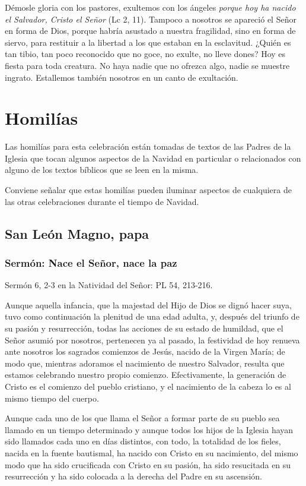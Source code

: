 \begin{body}
\begin{body}
Démosle gloria con los pastores, exultemos con los ángeles \emph{porque hoy ha nacido el Salvador, Cristo el Señor} (Lc 2, 11). Tampoco a nosotros se apareció el Señor en forma de Dios, porque habría asustado a nuestra fragilidad, sino en forma de siervo, para restituir a la libertad a los que estaban en la esclavitud. ¿Quién es tan tibio, tan poco reconocido que no goce, no exulte, no lleve dones? Hoy es fiesta para toda creatura. No haya nadie que no ofrezca algo, nadie se muestre ingrato. Estallemos también nosotros en un canto de exultación.

\section{Homilías}

Las homilías para esta celebración están tomadas de textos de las Padres de la Iglesia que tocan algunos aspectos de la Navidad en particular o relacionados con alguno de los textos bíblicos que se leen en la misma.

Conviene señalar que estas homilías pueden iluminar aspectos de cualquiera de las otras celebraciones durante el tiempo de Navidad.

\subsection{San León Magno, papa}

\subsubsection{Sermón: Nace el Señor, nace la paz}

Sermón 6, 2-3 en la Natividad del Señor: PL 54, 213-216.

Aunque aquella infancia, que la majestad del Hijo de Dios se dignó hacer suya, tuvo como continuación la plenitud de una edad adulta, y, después del triunfo de su pasión y resurrección, todas las acciones de su estado de humildad, que el Señor asumió por nosotros, pertenecen ya al pasado, la festividad de hoy renueva ante nosotros los sagrados comienzos de Jesús, nacido de la Virgen María; de modo que, mientras adoramos el nacimiento de nuestro Salvador, resulta que estamos celebrando nuestro propio comienzo. Efectivamente, la generación de Cristo es el comienzo del pueblo cristiano, y el nacimiento de la cabeza lo es al mismo tiempo del cuerpo.

Aunque cada uno de los que llama el Señor a formar parte de su pueblo sea llamado en un tiempo determinado y aunque todos los hijos de la Iglesia hayan sido llamados cada uno en días distintos, con todo, la totalidad de los fieles, nacida en la fuente bautismal, ha nacido con Cristo en su nacimiento, del mismo modo que ha sido crucificada con Cristo en su pasión, ha sido resucitada en su resurrección y ha sido colocada a la derecha del Padre en su ascensión.


\end{body}
\end{body}
